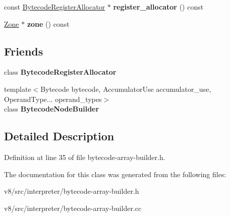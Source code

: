 \begin{DoxyCompactItemize}
\item 
\mbox{\label{classv8_1_1internal_1_1interpreter_1_1BytecodeArrayBuilder_aea5c4d6f55909855c75530c78e281041}} 
const \mbox{\hyperlink{classv8_1_1internal_1_1interpreter_1_1BytecodeRegisterAllocator}{Bytecode\+Register\+Allocator}} $\ast$ {\bfseries register\+\_\+allocator} () const
\item 
\mbox{\label{classv8_1_1internal_1_1interpreter_1_1BytecodeArrayBuilder_aaa7c1b152076f2e7e21d00ce89a48061}} 
\mbox{\hyperlink{classv8_1_1internal_1_1Zone}{Zone}} $\ast$ {\bfseries zone} () const
\end{DoxyCompactItemize}
\subsection*{Friends}
\begin{DoxyCompactItemize}
\item 
\mbox{\label{classv8_1_1internal_1_1interpreter_1_1BytecodeArrayBuilder_a6c4ddb408c6a194cb1f6eefea239cd51}} 
class {\bfseries Bytecode\+Register\+Allocator}
\item 
\mbox{\label{classv8_1_1internal_1_1interpreter_1_1BytecodeArrayBuilder_aaae354ff4d905c28732d483438230c93}} 
{\footnotesize template$<$Bytecode bytecode, Accumulator\+Use accumulator\+\_\+use, Operand\+Type... operand\+\_\+types$>$ }\\class {\bfseries Bytecode\+Node\+Builder}
\end{DoxyCompactItemize}


\subsection{Detailed Description}


Definition at line 35 of file bytecode-\/array-\/builder.\+h.



The documentation for this class was generated from the following files\+:\begin{DoxyCompactItemize}
\item 
v8/src/interpreter/bytecode-\/array-\/builder.\+h\item 
v8/src/interpreter/bytecode-\/array-\/builder.\+cc\end{DoxyCompactItemize}
